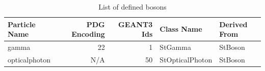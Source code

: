 \documentclass[twoside]{article}
\begin{document}
\begin{table}[htb]
    \begin{center}
    \begin{tabular}{|l|r|r|l| l |}
        \hline
        \textbf{Particle Name} & \textbf{PDG Encoding} & \textbf{GEANT3 Ids}  & \textbf{Class Name} & \textbf{Derived From} \\ \hline
         gamma  & 22    & 1     &              StGamma  & StBoson        \\ \hline
 opticalphoton  & N/A   & 50    &      StOpticalPhoton  & StBoson        \\ \hline
    \end{tabular}            
    \caption{List of defined bosons}
    \label{tab:bosons}
    \end{center}
\end{table}
\end{document}
